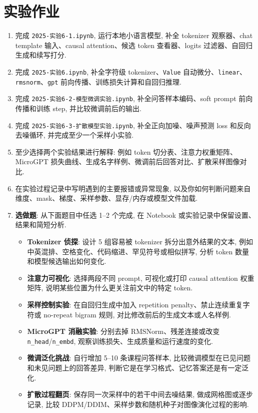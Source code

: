 \documentclass{../../nndlcourse}
\begin{document}
\section{实验作业}

\begin{enumerate}
    \item 完成 \texttt{2025-实验6-1.ipynb}, 运行本地小语言模型, 补全 tokenizer 观察器、chat template 输入、causal attention、候选 token 查看器、logits 过滤器、自回归生成和续写打分.
    \item 完成 \texttt{2025-实验6.ipynb}, 补全字符级 tokenizer、\texttt{Value} 自动微分、\texttt{linear}、\texttt{rmsnorm}、\texttt{gpt} 前向传播、训练损失计算和自回归推理.
    \item 完成 \texttt{2025-实验6-2-模型微调实验.ipynb}, 补全问答样本编码、soft prompt 前向传播和训练 step, 并比较微调前后的输出.
    \item 完成 \texttt{2025-实验6-3-扩散模型实验.ipynb}, 补全正向加噪、噪声预测 loss 和反向去噪循环, 并完成至少一个采样小实验.
    \item 至少选择两个实验结果进行解释: 例如 token 切分表、注意力权重矩阵、MicroGPT 损失曲线、生成名字样例、微调前后回答对比、扩散采样图像对比.
    \item 在实验过程记录中写明遇到的主要报错或异常现象, 以及你如何判断问题来自维度、mask、梯度、采样参数、显存/内存或模型文件加载.
    \item \textbf{选做题}: 从下面题目中任选 1--2 个完成, 在 Notebook 或实验记录中保留设置、结果和简短分析.
    \begin{itemize}
        \item \textbf{Tokenizer 侦探}: 设计 5 组容易被 tokenizer 拆分出意外结果的文本, 例如中英混排、空格变化、代码缩进、罕见符号或相似拼写, 分析 token 数量和模型候选输出如何变化.
        \item \textbf{注意力可视化}: 选择两段不同 prompt, 可视化或打印 causal attention 权重矩阵, 说明某些位置为什么更关注前文中的特定 token.
        \item \textbf{采样控制实验}: 在自回归生成中加入 repetition penalty、禁止连续重复字符或 no-repeat bigram 规则, 对比修改前后的生成文本或人名样例.
        \item \textbf{MicroGPT 消融实验}: 分别去掉 RMSNorm、残差连接或改变 \texttt{n\_head}/\texttt{n\_embd}, 观察训练损失、生成质量和运行速度的变化.
        \item \textbf{微调泛化挑战}: 自行增加 5--10 条课程问答样本, 比较微调模型在已见问题和未见问题上的回答差异, 判断它是在学习格式、记忆答案还是有一定泛化.
        \item \textbf{扩散过程翻页}: 保存同一次采样中的若干中间去噪结果, 做成网格图或逐步记录, 比较 DDPM/DDIM、采样步数和随机种子对图像演化过程的影响.
    \end{itemize}
\end{enumerate}
\end{document}
